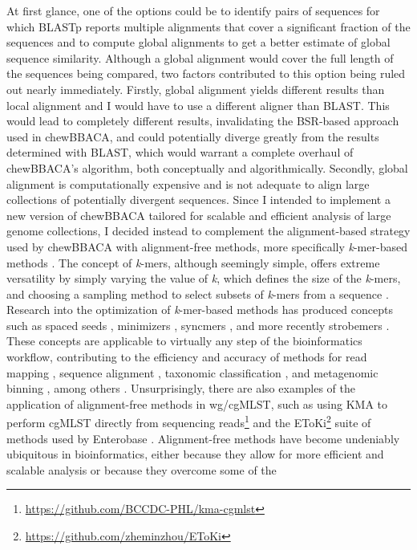 At first glance, one of the options could be to identify pairs of sequences for which \ac{BLASTp} reports multiple alignments that cover a significant fraction of the sequences and to compute global alignments to get a better estimate of global sequence similarity. Although a global alignment would cover the full length of the sequences being compared, two factors contributed to this option being ruled out nearly immediately. Firstly, global alignment yields different results than local alignment and I would have to use a different aligner than \ac{BLAST}. This would lead to completely different results, invalidating the \ac{BSR}-based approach used in chewBBACA, and could potentially diverge greatly from the results determined with \ac{BLAST}, which would warrant a complete overhaul of chewBBACA's algorithm, both conceptually and algorithmically. Secondly, global alignment is computationally expensive and is not adequate to align large collections of potentially divergent sequences. Since I intended to implement a new version of chewBBACA tailored for scalable and efficient analysis of large genome collections, I decided instead to complement the alignment-based strategy used by chewBBACA with alignment-free methods, more specifically \textit{k}-mer-based methods \cite{swain_interpreting_2022, zielezinski_alignment-free_2017}. The concept of \textit{k}-mers, although seemingly simple, offers extreme versatility by simply varying the value of \textit{k}, which defines the size of the \textit{k}-mers, and choosing a sampling method to select subsets of \textit{k}-mers from a sequence \cite{shaw_theory_2022}. Research into the optimization of \textit{k}-mer-based methods has produced concepts such as spaced seeds \cite{brinda_spaced_2015, hantze_effects_2023}, minimizers \cite{schleimer_winnowing_nodate, ndiaye_when_2024, belbasi_minimizer_2022, roberts_reducing_2004, marcais_improving_2017, zheng_improved_2020}, syncmers \cite{edgar_syncmers_2021, dutta_parameterized_2022}, and more recently strobemers \cite{sahlin_effective_2021, karami_designing_2024, moeckel_survey_2024}. These concepts are applicable to virtually any step of the bioinformatics workflow, contributing to the efficiency and accuracy of methods for read mapping \cite{alser_technology_2021, vasimuddin_efficient_2019, li_minimap2_2018, sahlin_survey_2023}, sequence alignment \cite{camacho_blast_2009, gaston_x-mapper_2025, clausen_rapid_2018}, taxonomic classification \cite{menzel_fast_2016, song_centrifuger_2024, kim_centrifuge_2016, portik_evaluation_2022, lu_metagenome_2022, wood_improved_2019}, and metagenomic binning \cite{han_benchmarking_2025, wu_maxbin_2016, pan_semibin2_2023}, among others \cite{moeckel_survey_2024}. Unsurprisingly, there are also examples of the application of alignment-free methods in \ac{wg/cgMLST}, such as using KMA \cite{clausen_rapid_2018} to perform \ac{cgMLST} directly from sequencing reads\footnote{\url{https://github.com/BCCDC-PHL/kma-cgmlst}} and the EToKi\footnote{\url{https://github.com/zheminzhou/EToKi}} suite of methods used by Enterobase \cite{zhou_enterobase_2020, zhou_accurate_2020}. Alignment-free methods have become undeniably ubiquitous in bioinformatics, either because they allow for more efficient and scalable analysis or because they overcome some of the 